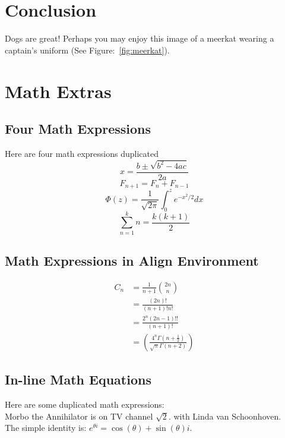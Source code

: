 \documentclass[11pt]{article}
\begin{document}
\section{Conclusion}
Dogs are great!
Perhaps you may enjoy this image of a meerkat wearing a captain's uniform (See Figure:~\ref{fig:meerkat}).

\section{Math Extras}
\subsection{Four Math Expressions}
Here are four math expressions duplicated
\[
x=\frac{b\pm\sqrt{b^2-4ac}}{2a}
\]
\[
F_{n+1}=F_{n}+F_{n-1}
\]
\[
\Phi(z)=\frac{1}{\sqrt{2\pi}}\int_{0}^z e^{-x^2/2}dx
\]
\[
\sum_{n=1}^{k} n=\frac{k(k+1)}{2}
\]
\subsection{Math Expressions in Align Environment}
\begin{align}
C_n&=\frac{1}{n+1}\binom{2n}{n} \\
&=\frac{(2n)!}{(n+1)!n!} \\
&=\frac{2^n(2n-1)!!}{(n+1)!} \\
&=\left ( \frac{4^n\Gamma(n+\frac{1}{2})}{\sqrt{\pi}\Gamma(n+2)} \right )
\end{align}
\subsection{In-line Math Equations}
Here are some duplicated math expressions:\\
\indent
Morbo the Annihilator is on TV channel $\sqrt{2}$. with Linda van Schoonhoven.\\
\indent
The simple identity is: $e^{\theta i} = \cos{(\theta)} + \sin{(\theta)}i$.


\end{document}
